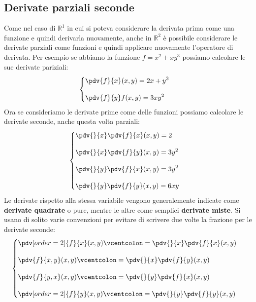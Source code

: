 \subsection{Derivate parziali seconde}
Come nel caso di $\mathbb{R}^1$ in cui si poteva considerare la derivata prima 
come una funzione e quindi derivarla nuovamente, anche in $\mathbb{R}^2$ è 
possibile considerare le derivate parziali come funzioni e quindi applicare 
nuovamente l'operatore di derivata. Per esempio se abbiamo la funzione $f = x^2 
+ xy^3$ possiamo calcolare le sue derivate pariziali:
\begin{equation*}
	\begin{cases}
		\displaystyle \pdv{f}{x} (x, y) = 2x + y^3\\[10pt]
		\displaystyle \pdv{f}{y} f(x, y) = 3xy^2
	\end{cases}
\end{equation*}
Ora se consideriamo le derivate prime come delle funzioni possiamo calcolare 
le derivate seconde, anche questa volta parziali:
\begin{equation*}
	\begin{cases}
		\displaystyle \pdv{}{x} \pdv{f}{x}(x, y) = 2\\[10pt]
		\displaystyle \pdv{}{x} \pdv{f}{y}(x, y) = 3y^2\\[10pt]
		\displaystyle \pdv{}{y} \pdv{f}{x}(x, y) = 3y^2\\[10pt]
		\displaystyle \pdv{}{y} \pdv{f}{y}(x, y) = 6xy
	\end{cases}
\end{equation*}
Le derivate rispetto alla stessa variabile vengono generalemente indicate come 
\textbf{derivate quadrate} o pure, mentre le altre come semplici 
\textbf{derivate miste}. Si usano di solito varie convenzioni per evitare di 
scrivere due volte la frazione per le derivate seconde: 
\begin{equation*}
	\begin{cases}
		\displaystyle \pdv[order=2]{f}{x}(x, y) \vcentcolon = 
		\displaystyle \pdv{}{x} \pdv{f}{x}(x, y) \\[10pt]
		\displaystyle \pdv{f}{x,y}(x, y) \vcentcolon = \displaystyle 
		\pdv{}{x} \pdv{f}{y}(x, y) \\[10pt]
		\displaystyle \pdv{f}{y,x}(x, y) \vcentcolon = \displaystyle 
		\pdv{}{y} \pdv{f}{x}(x, y) \\[10pt]
		\displaystyle \pdv[order=2]{f}{y}(x, y) \vcentcolon = 
		\displaystyle \pdv{}{y} \pdv{f}{y}(x, y) 
	\end{cases}
\end{equation*}

